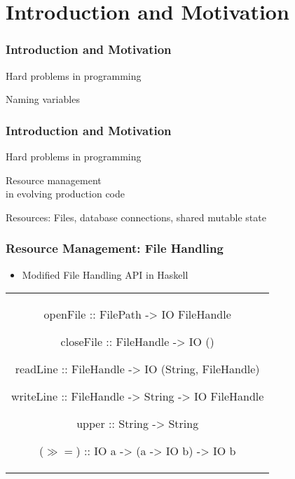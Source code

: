 \section{Introduction and Motivation}\label{sec:introduction}

\begin{frame}[c]
  \frametitle{Introduction and Motivation}
  {\large
    \begin{center}
      Hard problems in programming

      {\LARGE \color{red}Naming variables}
    \end{center}
    }
\end{frame}

\begin{frame}
  \frametitle{Introduction and Motivation}
  \begin{center}
    {\large Hard problems in programming}

    {\LARGE \color{red}Resource management}
    \\{\normalsize  in evolving production code}

    {\normalsize Resources: Files, database connections, shared mutable state}
\end{center}
\end{frame}

\begin{frame}[fragile, c]
  \frametitle{Resource Management: File Handling}
  \begin{center}
    \begin{itemize}
    \item Modified File Handling API in Haskell
    \end{itemize}
    \begin{tabular}[h]{c}
      \begin{haskell}

     openFile   :: FilePath   -> IO FileHandle

     closeFile  :: FileHandle -> IO ()

     readLine   :: FileHandle -> IO (String, FileHandle)

     writeLine  :: FileHandle -> String
                              -> IO FileHandle


     upper      :: String     -> String

     ($\gg\!=$) :: IO a -> (a -> IO b) -> IO b
      \end{haskell}
    \end{tabular}
\end{center}
\end{frame}

